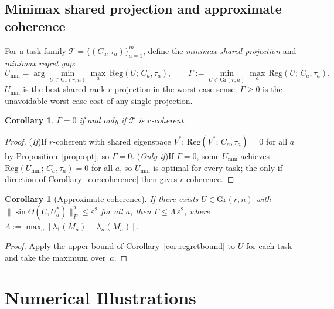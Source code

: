 \documentclass[final,3p,times]{elsarticle}
\newtheorem{corollary}[theorem]{Corollary}
\newcommand{\Gr}{\mathrm{Gr}}
\begin{document}
\subsection{Minimax shared projection and approximate coherence}
\label{sec:minimax}

For a task family $\mathcal{T}=\{(C_a,\tau_a)\}_{a=1}^m$, define the
\emph{minimax shared projection} and \emph{minimax regret gap}:
\begin{equation}\label{eq:mm}
  U_{\mathrm{mm}}
  = \arg\min_{U\in\Gr(r,n)}\max_a\,\mathrm{Reg}(U;\,C_a,\tau_a),
  \qquad
  \Gamma
  := \min_{U\in\Gr(r,n)}\max_a\,\mathrm{Reg}(U;\,C_a,\tau_a).
\end{equation}
$U_{\mathrm{mm}}$ is the best shared rank-$r$ projection in the worst-case sense;
$\Gamma\ge 0$ is the unavoidable worst-case cost of any single projection.

\begin{corollary}\label{cor:gammazero}
$\Gamma=0$ if and only if $\mathcal{T}$ is $r$-coherent.
\end{corollary}

\begin{proof}
(\emph{If})\enspace If $r$-coherent with shared eigenspace $V^*$:
$\mathrm{Reg}(V^*;\,C_a,\tau_a)=0$ for all $a$ by
Proposition~\ref{prop:opt}, so $\Gamma=0$.
(\emph{Only if})\enspace If $\Gamma=0$, some $U_{\mathrm{mm}}$ achieves
$\mathrm{Reg}(U_{\mathrm{mm}};\,C_a,\tau_a)=0$ for all $a$, so
$U_{\mathrm{mm}}$ is optimal for every task; the only-if direction of
Corollary~\ref{cor:coherence} then gives $r$-coherence.
\end{proof}

\begin{corollary}[Approximate coherence]\label{cor:approxcoh}
If there exists $U\in\Gr(r,n)$ with
$\|\sin\Theta(U,U_a^*)\|_F^2\le\varepsilon^2$ for all $a$, then
$\Gamma\le\Lambda\,\varepsilon^2$,
where $\Lambda:=\max_a[\lambda_1(M_a)-\lambda_n(M_a)]$.
\end{corollary}

\begin{proof}
Apply the upper bound of Corollary~\ref{cor:regretbound} to $U$ for each
task and take the maximum over~$a$.
\end{proof}

\section{Numerical Illustrations}
\end{document}

